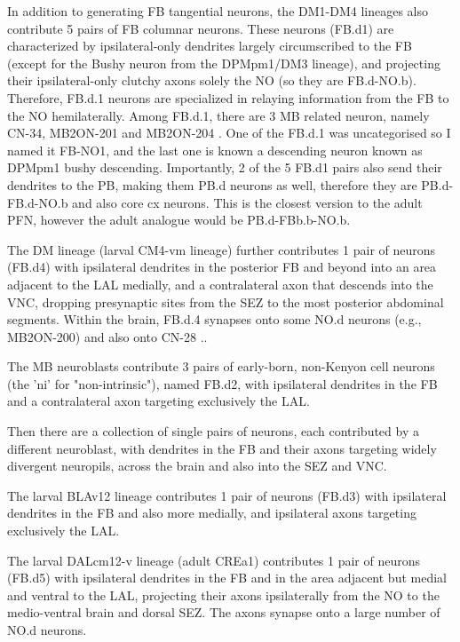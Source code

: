             In addition to generating FB tangential neurons, the DM1-DM4 lineages also contribute 5 pairs of FB columnar neurons. These neurons (FB.d1) are characterized by ipsilateral-only dendrites largely circumscribed to the FB (except for the Bushy neuron from the DPMpm1/DM3 lineage), and projecting their ipsilateral-only clutchy axons solely the NO (so they are FB.d-NO.b). Therefore, FB.d.1 neurons are specialized in relaying information from the FB to the NO hemilaterally. Among FB.d.1, there are 3 MB related neuron, namely CN-34, MB2ON-201 and MB2ON-204  \citep{eschbach2021circuits}. One of the FB.d.1 was uncategorised so I named it FB-NO1, and the last one is known a descending neuron known as DPMpm1 bushy descending. 
            Importantly, 2 of the 5 FB.d1 pairs also send their dendrites to the PB, making them PB.d neurons as well, therefore they are PB.d-FB.d-NO.b and also core cx neurons. This is the closest version to the adult PFN, however the adult analogue would be PB.d-FBb.b-NO.b. %

            The DM lineage (larval CM4-vm lineage) further contributes 1 pair of neurons (FB.d4) with ipsilateral dendrites in the posterior FB and beyond into an area adjacent to the LAL medially, and a contralateral axon that descends into the VNC, dropping presynaptic sites from the SEZ to the most posterior abdominal segments. Within the brain, FB.d.4 synapses onto some NO.d neurons (e.g., MB2ON-200) and also onto CN-28 \citep{eschbach2021circuits}..

            The MB neuroblasts contribute 3 pairs of early-born, non-Kenyon cell neurons (the 'ni' for "non-intrinsic"), named FB.d2, with ipsilateral dendrites in the FB and a contralateral axon targeting exclusively the LAL.

            Then there are a collection of single pairs of neurons, each contributed by a different neuroblast, with dendrites in the FB and their axons targeting widely divergent neuropils, across the brain and also into the SEZ and VNC.

            The larval BLAv12 lineage contributes 1 pair of neurons (FB.d3) with ipsilateral dendrites in the FB and also more medially, and ipsilateral axons targeting exclusively the LAL.

            The larval DALcm12-v lineage (adult CREa1) contributes 1 pair of neurons (FB.d5) with ipsilateral dendrites in the FB and in the area adjacent but medial and ventral to the LAL, projecting their axons ipsilaterally from the NO to the medio-ventral brain and dorsal SEZ. The axons synapse onto a large number of NO.d neurons.

